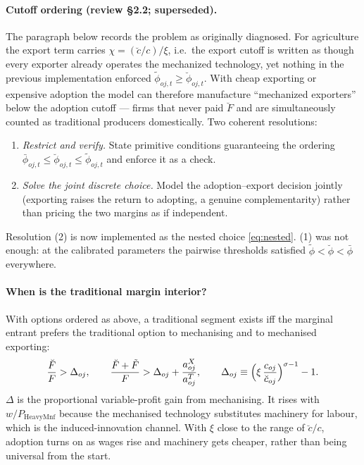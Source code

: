 \documentclass[11pt]{article}
\begin{document}
\paragraph{Cutoff ordering (review \S2.2; superseded).} The paragraph below records the
problem as originally diagnosed. For agriculture the export term carries
$\chi=(\breve c/c)/\xi$, i.e.\ the export cutoff is written as though every exporter
already operates the mechanized technology, yet nothing in the previous implementation
enforced $\tilde\phi_{oj,t}\ge \breve\phi_{oj,t}$. With cheap exporting or expensive
adoption the model can therefore manufacture ``mechanized exporters'' below the adoption
cutoff --- firms that never paid $\breve F$ and are simultaneously counted as traditional
producers domestically. Two coherent resolutions:
\begin{enumerate}[leftmargin=1.5em]
\item \emph{Restrict and verify.} State primitive conditions guaranteeing the ordering
      $\bar\phi_{oj,t}\le\breve\phi_{oj,t}\le\tilde\phi_{oj,t}$ and enforce it as a check.
\item \emph{Solve the joint discrete choice.} Model the adoption--export decision jointly
      (exporting raises the return to adopting, a genuine complementarity) rather than
      pricing the two margins as if independent.
\end{enumerate}
Resolution (2) is now implemented as the nested choice \eqref{eq:nested}. (1) was not
enough: at the calibrated parameters the pairwise thresholds satisfied
$\tilde\phi<\breve\phi<\bar\phi$ everywhere.

\paragraph{When is the traditional margin interior?} With options ordered as above, a
traditional segment exists iff the marginal entrant prefers the traditional option to
mechanising and to mechanised exporting:
\begin{equation}
  \frac{\breve F}{F} > \Delta_{oj},
  \qquad
  \frac{\breve F+\tilde F}{F} > \Delta_{oj}+\frac{a^{X}_{oj}}{a^{T}_{oj}},
  \qquad
  \Delta_{oj}\equiv\Bigl(\xi\,\frac{c_{oj}}{\breve c_{oj}}\Bigr)^{\sigma-1}-1 .
  \label{eq:interior}
\end{equation}
$\Delta$ is the proportional variable-profit gain from mechanising. It rises with
$w/P_{\mathrm{HeavyMnf}}$ because the mechanised technology substitutes machinery for
labour, which is the induced-innovation channel. With $\xi$ close to the range of
$\breve c/c$, adoption turns on as wages rise and machinery gets cheaper, rather than being
universal from the start.
\end{document}
